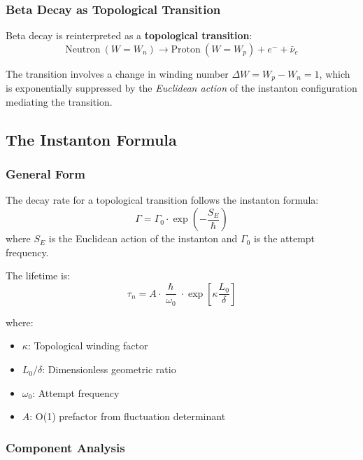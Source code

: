 \documentclass[11pt,a4paper]{article}
\newcommand{\hbar}{\hslash}
\begin{document}
\subsubsection{Beta Decay as Topological Transition}

Beta decay is reinterpreted as a \textbf{topological transition}:
\begin{equation}
\text{Neutron}\ (W = W_n) \longrightarrow \text{Proton}\ (W = W_p) + e^- + \bar{\nu}_e
\end{equation}

The transition involves a change in winding number $\Delta W = W_p - W_n = 1$, which is exponentially suppressed by the \emph{Euclidean action} of the instanton configuration mediating the transition.

\subsection{The Instanton Formula}

\subsubsection{General Form}

The decay rate for a topological transition follows the instanton formula:
\begin{equation}
\Gamma = \Gamma_0 \cdot \exp\left(-\frac{S_E}{\hbar}\right)
\end{equation}
where $S_E$ is the Euclidean action of the instanton and $\Gamma_0$ is the attempt frequency.

The lifetime is:
\begin{equation}
\boxed{\tau_n = A \cdot \frac{\hbar}{\omega_0} \cdot \exp\left[\kappa \frac{L_0}{\delta}\right]}
\label{eq:tau-formula}
\end{equation}

where:
\begin{itemize}
\item $\kappa$: Topological winding factor
\item $L_0/\delta$: Dimensionless geometric ratio
\item $\omega_0$: Attempt frequency
\item $A$: O(1) prefactor from fluctuation determinant
\end{itemize}

\subsubsection{Component Analysis}
\end{document}
